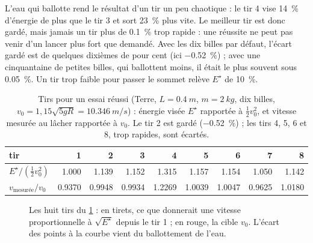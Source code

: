 L'eau qui ballotte rend le résultat d'un tir un peu chaotique : le tir 4 vise
\SI{14}{\percent} d'énergie de plus que le tir 3 et sort \SI{23}{\percent} plus
vite. Le meilleur tir est donc gardé, mais jamais un tir plus de
\SI{0,1}{\percent} trop rapide : une réussite ne peut pas venir d'un lancer plus
fort que demandé. Avec les dix billes par défaut, l'écart gardé est de quelques
dixièmes de pour cent (ici \SI{-0,52}{\percent}) ; avec une cinquantaine de
petites billes, qui ballottent moins, il était le plus souvent sous
\SI{0,05}{\percent}. Un tir trop faible pour passer le sommet relève \(E^\star\)
de \SI{10}{\percent}.

\begin{table}[ht]
  \centering
  \small
  \begin{tabular}{lrrrrrrrr}
    \toprule
    tir & 1 & 2 & 3 & 4 & 5 & 6 & 7 & 8 \\
    \midrule
    \(E^\star / (\tfrac12 v_0^2)\) & \num{1,000} & \num{1,139} & \num{1,152} & \num{1,315} & \num{1,157} & \num{1,154} & \num{1,050} & \num{1,142} \\
    \(v_{\text{mesurée}}/v_0\) & \num{0,9370} & \num{0,9948} & \num{0,9934} & \num{1,2269} & \num{1,0039} & \num{1,0047} & \num{0,9625} & \num{1,0180} \\
    \bottomrule
  \end{tabular}
  \caption{Tirs pour un essai réussi (Terre, \(L = \SI{0,4}{m}\),
    \(m = \SI{2}{kg}\), dix billes, \(v_0 = 1{,}15 \sqrt{5 g R} = \SI{10,346}{m/s}\)) :
    énergie visée \(E^\star\) rapportée à \(\tfrac12 v_0^2\), et vitesse mesurée au
    lâcher rapportée à \(v_0\). Le tir 2 est gardé (\SI{-0,52}{\percent}) ; les
    tirs 4, 5, 6 et 8, trop rapides, sont écartés.}
  \label{tab-tirs}
\end{table}

\begin{figure}[ht]
  \centering
  \caption{Les huit tirs du \cref{tab-tirs} : en tirets, ce que donnerait une
    vitesse proportionnelle à \(\sqrt{E^\star}\) depuis le tir 1 ; en rouge, la
    cible \(v_0\). L'écart des points à la courbe vient du ballottement de l'eau.}
  \label{fig-tirs}
\end{figure}
